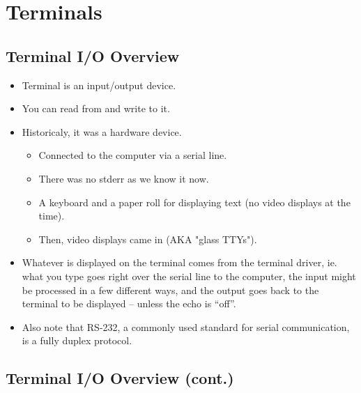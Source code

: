 
\section{Terminals}

\subsection{Terminal I/O Overview}

\begin{itemize}
\item Terminal is an input/output device.
\item You can read from and write to it.
\item Historicaly, it was a hardware device.
\begin{itemize}
	\item Connected to the computer via a serial line.
	\item There was no stderr as we know it now.
	\item A keyboard and a paper roll for displaying text (no video
	displays at the time).
	\item Then, video displays came in (AKA "glass TTYs").
\end{itemize}
\end{itemize}

\begin{itemize}
\item Whatever is displayed on the terminal comes from the terminal driver, ie.
what you type goes right over the serial line to the computer, the input might
be processed in a few different ways, and the output goes back to the terminal
to be displayed -- unless the echo is ``off''. 
\item Also note that RS-232, a commonly used standard for serial communication,
is a fully duplex protocol.
\end{itemize}

\subsection{Terminal I/O Overview (cont.)}

